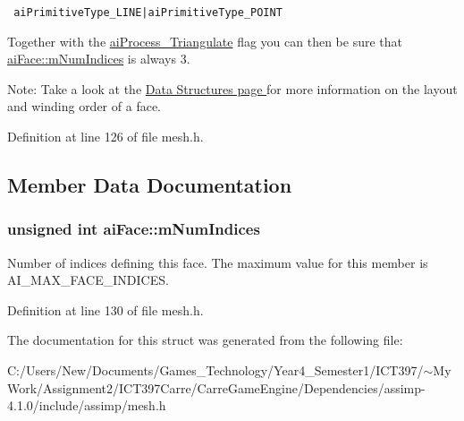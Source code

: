\begin{Code}\begin{verbatim} aiPrimitiveType_LINE|aiPrimitiveType_POINT
\end{verbatim}
\end{Code}

 Together with the \hyperlink{postprocess_8h_64795260b95f5a4b3f3dc1be4f52e4109c3de834f0307f31fa2b1b6d05dd592b}{aiProcess\_\-Triangulate} flag you can then be sure that \hyperlink{structai_face_dda2698cec0ebfe651572f4a5701360b}{aiFace::mNumIndices} is always 3. \begin{Desc}
\item[Note:]Take a look at the \hyperlink{}{Data Structures page } for more information on the layout and winding order of a face. \end{Desc}


Definition at line 126 of file mesh.h.

\subsection{Member Data Documentation}
\hypertarget{structai_face_dda2698cec0ebfe651572f4a5701360b}{
\subsubsection[mNumIndices]{\setlength{\rightskip}{0pt plus 5cm}unsigned int {\bf aiFace::mNumIndices}}}
\label{structai_face_dda2698cec0ebfe651572f4a5701360b}


Number of indices defining this face. The maximum value for this member is AI\_\-MAX\_\-FACE\_\-INDICES. 

Definition at line 130 of file mesh.h.

The documentation for this struct was generated from the following file:\begin{CompactItemize}
\item 
C:/Users/New/Documents/Games\_\-Technology/Year4\_\-Semester1/ICT397/$\sim$My Work/Assignment2/ICT397Carre/CarreGameEngine/Dependencies/assimp-4.1.0/include/assimp/mesh.h\end{CompactItemize}
